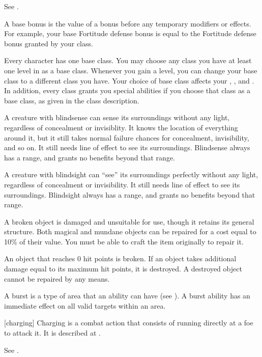  See .

 A base bonus is the value of a bonus before any temporary modifiers or effects. For example, your base Fortitude defense bonus is equal to the Fortitude defense bonus granted by your class.

 Every character has one base class.
You may choose any class you have at least one level in as a base class.
Whenever you gain a level, you can change your base class to a different class you have.
Your choice of base class affects your , , and .
In addition, every class grants you special abilities if you choose that class as a base class, as given in the class description.

 A creature with blindsense can sense its surroundings without any light, regardless of concealment or invisiblity.
It knows the location of everything around it, but it still takes normal failure chances for concealment, invisibility, and so on.
It still needs line of effect to see its surroundings.
Blindsense always has a range, and grants no benefits beyond that range.

 A creature with blindsight can ``see'' its surroundings perfectly without any light, regardless of concealment or invisibility.
It still needs line of effect to see its surroundings.
Blindsight always has a range, and grants no benefits beyond that range.

 A broken object is damaged and unsuitable for use, though it retains its general structure. Both magical and mundane objects can be repaired for a cost equal to 10\% of their value. You must be able to craft the item originally to repair it.

An object that reaches 0 hit points is broken. If an object takes additional damage equal to its maximum hit points, it is destroyed. A destroyed object cannot be repaired by any means.

 A burst is a type of area that an ability can have (see ).
A burst ability has an immediate effect on all valid targets within an area.

[charging] Charging is a combat action that consists of running directly at a foe to attack it.
It is described at .

 See .

